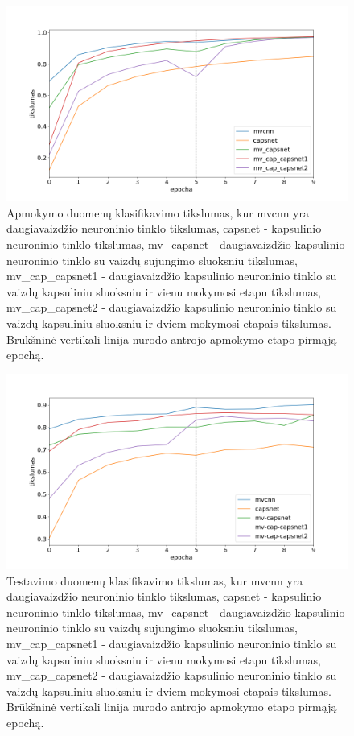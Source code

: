 \begin{figure}[H]
	\centering
	\includegraphics[scale=0.5]{img/trained.png}
	\caption{
		Apmokymo duomenų klasifikavimo tikslumas, kur mvcnn yra daugiavaizdžio neuroninio tinklo tikslumas, capsnet - kapsulinio neuroninio tinklo tikslumas, mv\_capsnet - daugiavaizdžio kapsulinio neuroninio tinklo su vaizdų sujungimo sluoksniu tikslumas, mv\_cap\_capsnet1 - daugiavaizdžio kapsulinio neuroninio tinklo su vaizdų kapsuliniu sluoksniu ir vienu mokymosi etapu tikslumas, mv\_cap\_capsnet2 - daugiavaizdžio kapsulinio neuroninio tinklo su vaizdų kapsuliniu sluoksniu ir dviem mokymosi etapais tikslumas. Brūkšninė vertikali linija nurodo antrojo apmokymo etapo pirmąją epochą.
	}
	\label{img:train_plot}
\end{figure}

\begin{figure}[H]
	\centering
	\includegraphics[scale=0.5]{img/validated.png}
	\caption{
		Testavimo duomenų klasifikavimo tikslumas, kur mvcnn yra daugiavaizdžio neuroninio tinklo tikslumas, capsnet - kapsulinio neuroninio tinklo tikslumas, mv\_capsnet - daugiavaizdžio kapsulinio neuroninio tinklo su vaizdų sujungimo sluoksniu tikslumas, mv\_cap\_capsnet1 - daugiavaizdžio kapsulinio neuroninio tinklo su vaizdų kapsuliniu sluoksniu ir vienu mokymosi etapu tikslumas, mv\_cap\_capsnet2 - daugiavaizdžio kapsulinio neuroninio tinklo su vaizdų kapsuliniu sluoksniu ir dviem mokymosi etapais tikslumas. Brūkšninė vertikali linija nurodo antrojo apmokymo etapo pirmąją epochą.
	}
	\label{img:val_plot}
\end{figure}
